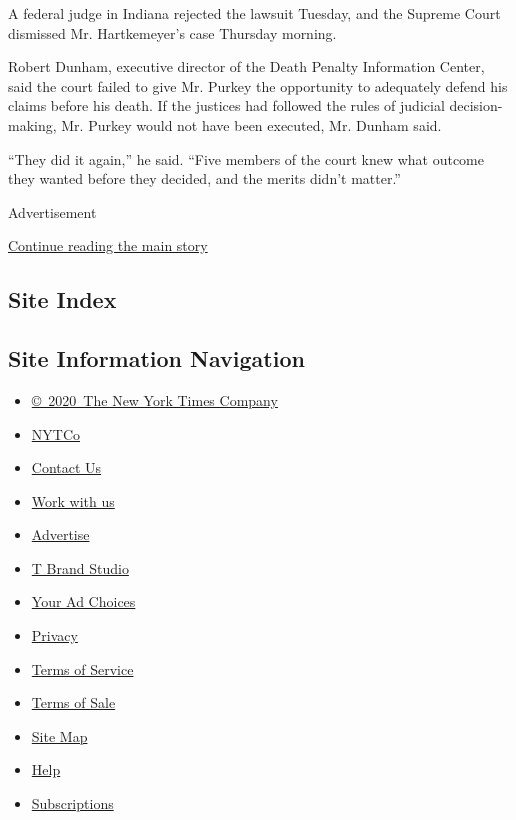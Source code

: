 A federal judge in Indiana rejected the lawsuit Tuesday, and the Supreme
Court dismissed Mr. Hartkemeyer's case Thursday morning.

Robert Dunham, executive director of the Death Penalty Information
Center, said the court failed to give Mr. Purkey the opportunity to
adequately defend his claims before his death. If the justices had
followed the rules of judicial decision-making, Mr. Purkey would not
have been executed, Mr. Dunham said.

``They did it again,'' he said. ``Five members of the court knew what
outcome they wanted before they decided, and the merits didn't matter.''

Advertisement

\protect\hyperlink{after-bottom}{Continue reading the main story}

\hypertarget{site-index}{%
\subsection{Site Index}\label{site-index}}

\hypertarget{site-information-navigation}{%
\subsection{Site Information
Navigation}\label{site-information-navigation}}

\begin{itemize}
\tightlist
\item
  \href{https://help.nytimes.com/hc/en-us/articles/115014792127-Copyright-notice}{©~2020~The
  New York Times Company}
\end{itemize}

\begin{itemize}
\tightlist
\item
  \href{https://www.nytco.com/}{NYTCo}
\item
  \href{https://help.nytimes.com/hc/en-us/articles/115015385887-Contact-Us}{Contact
  Us}
\item
  \href{https://www.nytco.com/careers/}{Work with us}
\item
  \href{https://nytmediakit.com/}{Advertise}
\item
  \href{http://www.tbrandstudio.com/}{T Brand Studio}
\item
  \href{https://www.nytimes.com/privacy/cookie-policy\#how-do-i-manage-trackers}{Your
  Ad Choices}
\item
  \href{https://www.nytimes.com/privacy}{Privacy}
\item
  \href{https://help.nytimes.com/hc/en-us/articles/115014893428-Terms-of-service}{Terms
  of Service}
\item
  \href{https://help.nytimes.com/hc/en-us/articles/115014893968-Terms-of-sale}{Terms
  of Sale}
\item
  \href{https://spiderbites.nytimes.com}{Site Map}
\item
  \href{https://help.nytimes.com/hc/en-us}{Help}
\item
  \href{https://www.nytimes.com/subscription?campaignId=37WXW}{Subscriptions}
\end{itemize}

